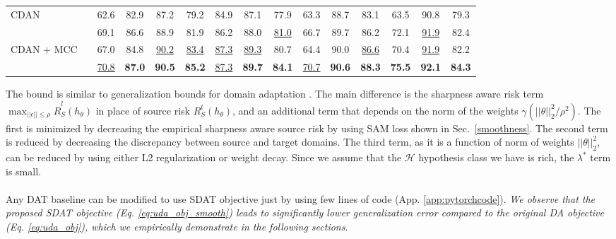 \documentclass[table,dvipsnames]{article}
\theoremstyle{plain}
\theoremstyle{definition}
\theoremstyle{remark}
\begin{document}
\begin{table*}[!t]
{\begin{tabular}{l|c|cccccccccccc|c}
    {CDAN}& & 62.6 & 82.9 & 87.2  & 79.2 & 84.9  & 87.1 & 77.9 & 63.3 & 88.7 & 83.1 & 63.5 & 90.8 & 79.3 \\
     \cellcolor{mygray}{CDAN w/ SDAT} && \cellcolor{mygray}69.1 & \cellcolor{mygray}86.6 & \cellcolor{mygray}88.9 & \cellcolor{mygray}81.9 & \cellcolor{mygray}86.2 & \cellcolor{mygray}88.0 & \cellcolor{mygray}\underline{81.0} & \cellcolor{mygray}66.7 & \cellcolor{mygray}89.7 & \cellcolor{mygray}86.2 & \cellcolor{mygray}72.1 & \cellcolor{mygray}\underline{91.9} & \cellcolor{mygray}82.4\Bstrut\\\cline{1-1}\cline{3-15}
    {CDAN + MCC}& & 67.0 & 84.8 & \underline{90.2} & \underline{83.4} & \underline{87.3} & \underline{89.3} & 80.7 & 64.4 & 90.0 & \underline{86.6} & 70.4 & \underline{91.9} & 82.2 \\
    \cellcolor{mygray}{CDAN + MCC w/ SDAT} && \cellcolor{mygray}\underline{70.8} & \cellcolor{mygray}\textbf{87.0} & \cellcolor{mygray}\textbf{90.5} & \cellcolor{mygray}\textbf{85.2} & \cellcolor{mygray}\underline{87.3} & \cellcolor{mygray}\textbf{89.7} & \cellcolor{mygray}\textbf{84.1} & \cellcolor{mygray}\underline{70.7} & \cellcolor{mygray}\textbf{90.6} & \cellcolor{mygray}\textbf{88.3} & \cellcolor{mygray}\textbf{75.5} & \cellcolor{mygray}\textbf{92.1} &\cellcolor{mygray} \textbf{84.3}
    \Bstrut\\\hline \hline
  \end{tabular}}



  \label{tab:officehome}
\end{table*}
The bound is similar to generalization bounds for domain adaptation \citep{ben2010theory, acuna2021f}. The main difference is the sharpness aware risk term $\max_{||\epsilon|| \leq \rho}\hat{R}^l_S(h_{\theta})$ in place of source risk $R^{l}_S(h_{\theta})$, and an additional term that depends on the norm of the weights $\gamma(||\theta||_2^2/\rho^2)$. 
The first is minimized by decreasing the empirical sharpness aware source risk by using SAM loss shown in Sec.\ \ref{smoothness}. The second term is reduced by decreasing the discrepancy between source and target domains. The third term, as it is a function of norm of weights $||\theta||_2^2$, can be reduced by using either L2 regularization or weight decay. Since we assume that the $\mathcal{H}$ hypothesis class we have is rich, the $\lambda^*$ term is small. \\ \\
Any DAT baseline can be modified to use SDAT objective just by using few lines of code (App. \ref{app:pytorchcode}). \emph{We observe that the proposed SDAT objective (Eq. \ref{eq:uda_obj_smooth}) leads to significantly lower generalization error compared to the original DA objective (Eq. \ref{eq:uda_obj}), which we empirically demonstrate in the following sections}.
\end{document}
